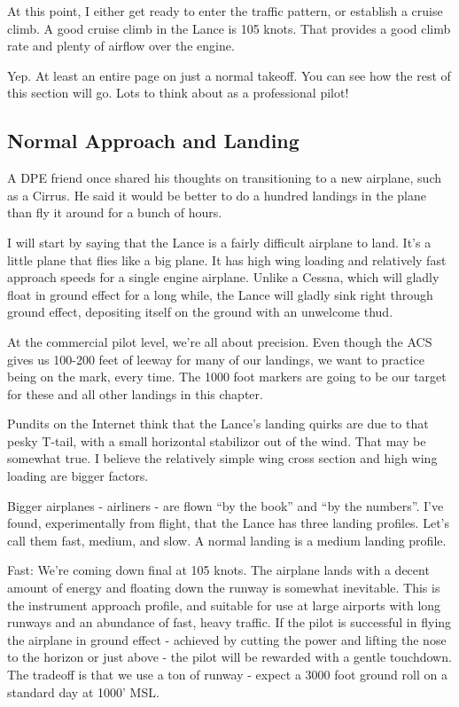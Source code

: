At this point, I either get ready to enter the traffic pattern, or establish a cruise climb. A good cruise climb in the Lance is 105 knots. That provides a good climb rate and plenty of airflow over the engine.

Yep. At least an entire page on just a normal takeoff. You can see how the rest of this section will go. Lots to think about as a professional pilot!

\subsection{Normal Approach and Landing}

A DPE friend once shared his thoughts on transitioning to a new airplane, such as a Cirrus. He said it would be better to do a hundred landings in the plane than fly it around for a bunch of hours.

I will start by saying that the Lance is a fairly difficult airplane to land. It's a little plane that flies like a big plane. It has high wing loading and relatively fast approach speeds for a single engine airplane. Unlike a Cessna, which will gladly float in ground effect for a long while, the Lance will gladly sink right through ground effect, depositing itself on the ground with an unwelcome thud.

At the commercial pilot level, we're all about precision. Even though the ACS gives us 100-200 feet of leeway for many of our landings, we want to practice being on the mark, every time. The 1000 foot markers are going to be our target for these and all other landings in this chapter.

Pundits on the Internet think that the Lance's landing quirks are due to that pesky T-tail, with a small horizontal stabilizor out of the wind. That may be somewhat true. I believe the relatively simple wing cross section and high wing loading are bigger factors.

Bigger airplanes - airliners - are flown ``by the book'' and ``by the numbers''. I've found, experimentally from flight, that the Lance has three landing profiles. Let's call them fast, medium, and slow. A normal landing is a medium landing profile.

Fast: We're coming down final at 105 knots. The airplane lands with a decent amount of energy and floating down the runway is somewhat inevitable. This is the instrument approach profile, and suitable for use at large airports with long runways and an abundance of fast, heavy traffic. If the pilot is successful in flying the airplane in ground effect - achieved by cutting the power and lifting the nose to the horizon or just above - the pilot will be rewarded with a gentle touchdown. The tradeoff is that we use a ton of runway - expect a 3000 foot ground roll on a standard day at 1000' MSL.

